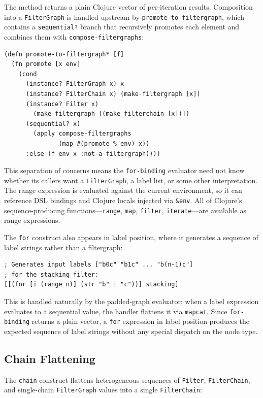 \documentclass[english,submission]{programming}
\begin{document}
The method returns a plain Clojure vector of per-iteration results. Composition into a \texttt{FilterGraph} is handled upstream by \texttt{promote-to-filtergraph}, which contains a \texttt{sequential?} branch that recursively promotes each element and combines them with \texttt{compose-filtergraphs}:

\begin{lstlisting}[caption={promote-to-filtergraph* with sequential? branch}]
(defn promote-to-filtergraph* [f]
  (fn promote [x env]
    (cond
      (instance? FilterGraph x) x
      (instance? FilterChain x) (make-filtergraph [x])
      (instance? Filter x)
        (make-filtergraph [(make-filterchain [x])])
      (sequential? x)
        (apply compose-filtergraphs
               (map #(promote % env) x))
      :else (f env x :not-a-filtergraph))))
\end{lstlisting}

This separation of concerns means the \texttt{for-binding} evaluator need not know whether its callers want a \texttt{FilterGraph}, a label list, or some other interpretation. The range expression is evaluated against the current environment, so it can reference DSL bindings and Clojure locals injected via \texttt{\&env}. All of Clojure's sequence-producing functions---\texttt{range}, \texttt{map}, \texttt{filter}, \texttt{iterate}---are available as range expressions.

The \texttt{for} construct also appears in label position, where it generates a sequence of label strings rather than a filtergraph:

\begin{lstlisting}[caption={for in label position}]
; Generates input labels ["b0c" "b1c" ... "b(n-1)c"]
; for the stacking filter:
[[(for [i (range n)] (str "b" i "c"))] stacking]
\end{lstlisting}

This is handled naturally by the padded-graph evaluator: when a label expression evaluates to a sequential value, the handler flattens it via \texttt{mapcat}. Since \texttt{for-binding} returns a plain vector, a \texttt{for} expression in label position produces the expected sequence of label strings without any special dispatch on the node type.

\subsection{Chain Flattening}

The \texttt{chain} construct flattens heterogeneous sequences of \texttt{Filter}, \texttt{FilterChain}, and single-chain \texttt{FilterGraph} values into a single \texttt{FilterChain}:
\end{document}
